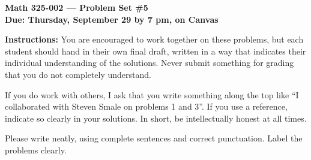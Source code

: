\documentclass{amsart}
\begin{document}
\begin{center}
{\large\bfseries
Math 325-002 --- Problem Set \#5 \\
Due: Thursday, September 29 by 7 pm, on Canvas}
\end{center}





{\bf Instructions:} You are encouraged to work together on these
problems, but each student should hand in their own final draft,
written in a way that indicates their individual understanding of
the solutions. Never submit something for grading
that you do not completely understand. 

If you do work with others, I ask that you write something along the
top like ``I collaborated with Steven Smale on problems 1 and 3''.
If you use a reference, indicate so clearly in your solutions. 
In short, be intellectually
honest at all times.

Please write neatly, using complete sentences and correct
punctuation. Label the problems clearly. 
\end{document}
